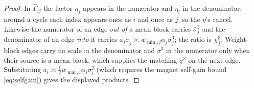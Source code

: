 \documentclass[11pt]{article}
\theoremstyle{definition}
\begin{document}
\begin{proof}
In $\hat\Gamma_{ij}$ the factor $\eta_j$ appears in the numerator and $\eta_i$ in
the denominator; around a cycle each index appears once as $i$ and once as $j$,
so the $\eta$'s cancel. Likewise the numerator of an edge \emph{out of} a mean
block carries $\bar\sigma_j^3$ and the denominator of an edge \emph{into} it
carries $a_j\underline\sigma_j \asymp w_{\min,j}\alpha_j\underline\sigma_j^3$; the
ratio is $\chi_j^3$. Weight-block edges carry no scale in the denominator and
$\bar\sigma^3$ in the numerator only when their source is a mean block, which
supplies the matching $\underline\sigma^3$ on the next edge. Substituting
$a_i \asymp \tfrac12 w_{\min,i}\alpha_i\underline\sigma_i^2$ (which requires the
magnet self-gain bound \eqref{eq:selfgain}) gives the displayed products.
\end{proof}
\end{document}
